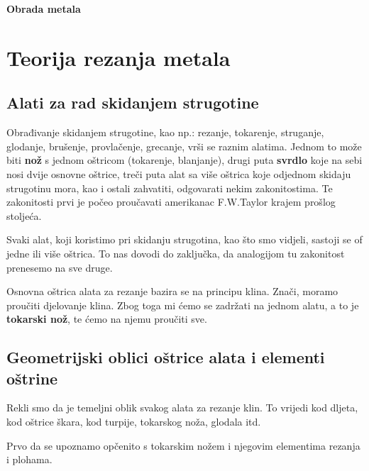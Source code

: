 \documentclass[a4paper,12pt]{article}
\numberwithin{figure}{section}
\begin{document}
\begin{titlepage}
\begin{titlepage}
  

  \begin{center}

  {\huge\bfseries Obrada metala}
  \vskip 2cm
  
  \end{center}

\end{titlepage}
\end{titlepage}
\clearpage
\tableofcontents
\clearpage
\section{Teorija rezanja metala}
\subsection{Alati za rad skidanjem strugotine}
Obrađivanje skidanjem strugotine, kao np.: rezanje, tokarenje, struganje, glodanje, brušenje, provlačenje, grecanje, vrši se raznim alatima. Jednom to može biti \textbf{nož} s jednom oštricom (tokarenje, blanjanje), drugi puta \textbf{svrdlo} koje na sebi nosi dvije osnovne oštrice, treči puta alat sa više oštrica koje odjednom skidaju strugotinu mora, kao i ostali zahvatiti, odgovarati nekim zakonitostima. Te zakonitosti prvi je počeo proučavati amerikanac F.W.Taylor krajem prošlog stoljeća.\par
Svaki alat, koji koristimo pri skidanju strugotina, kao što smo vidjeli, sastoji se of jedne ili više oštrica. To nas dovodi do zaključka, da analogijom tu zakonitost prenesemo na sve druge.\par
Osnovna oštrica alata za rezanje bazira se na principu klina. Znači, moramo proučiti djelovanje klina. Zbog toga mi ćemo se zadržati na jednom alatu, a to je \textbf{tokarski nož}, te ćemo na njemu proučiti sve.
\subsection{Geometrijski oblici oštrice alata i elementi oštrine}
Rekli smo da je temeljni oblik svakog alata za rezanje klin. To vrijedi kod dljeta, kod oštrice škara, kod turpije, tokarskog noža, glodala itd. \par
Prvo da se upoznamo opčenito s tokarskim nožem i njegovim elementima rezanja i plohama.
\end{document}
